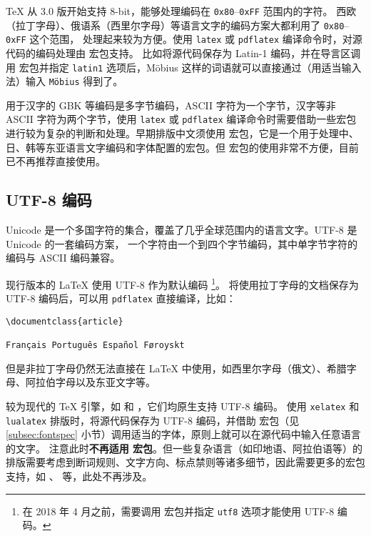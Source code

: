 \TeX{} 从 3.0 版开始支持 8-bit，能够处理编码在 \texttt{0x80}--\texttt{0xFF} 范围内的字符。
西欧（拉丁字母）、俄语系（西里尔字母）等语言文字的编码方案大都利用了 \texttt{0x80}--\texttt{0xFF} 这个范围，
处理起来较为方便。使用 \texttt{latex} 或 \texttt{pdflatex} 编译命令时，对源代码的编码处理由  宏包支持。
比如将源代码保存为 Latin-1 编码，并在导言区调用  宏包并指定 \texttt{latin1} 选项后，M\"obius 这样的词语就可以直接通过（用适当输入法）输入 \texttt{M\"obius} 得到了。

用于汉字的 GBK 等编码是多字节编码，ASCII 字符为一个字节，汉字等非 ASCII 字符为两个字节，使用
\texttt{latex} 或 \texttt{pdflatex} 编译命令时需要借助一些宏包进行较为复杂的判断和处理。早期排版中文须使用  宏包，它是一个用于处理中、日、韩等东亚语言文字编码和字体配置的宏包。但  宏包的使用非常不方便，目前已不再推荐直接使用。

\subsection{UTF-8 编码}\label{subsec:utf8}

Unicode 是一个多国字符的集合，覆盖了几乎全球范围内的语言文字。UTF-8 是 Unicode 的一套编码方案，
一个字符由一个到四个字节编码，其中单字节字符的编码与 ASCII 编码兼容。

现行版本的 \LaTeX{} 使用 UTF-8 作为默认编码%
\footnote{在 2018 年 4 月之前，需要调用  宏包并指定 \texttt{utf8} 选项才能使用 UTF-8 编码。}。
将使用拉丁字母的文档保存为 UTF-8 编码后，可以用 \texttt{pdflatex} 直接编译，比如：

\begin{verbatim}
\documentclass{article}

Français Português Español Føroyskt

\end{verbatim}

但是非拉丁字母仍然无法直接在 \LaTeX{} 中使用，如西里尔字母（俄文）、希腊字母、阿拉伯字母以及东亚文字等。

较为现代的 \TeX{} 引擎，如  和 ，它们均原生支持 UTF-8 编码。
使用 \texttt{xelatex} 和 \texttt{lualatex} 排版时，将源代码保存为 UTF-8 编码，并借助
 宏包（见 \ref{subsec:fontspec} 小节）调用适当的字体，原则上就可以在源代码中输入任意语言的文字。
注意此时\textbf{不再适用  宏包}。但一些复杂语言（如印地语、阿拉伯语等）的排版需要考虑到断词规则、文字方向、标点禁则等诸多细节，因此需要更多的宏包支持，如 、  等，此处不再涉及。

